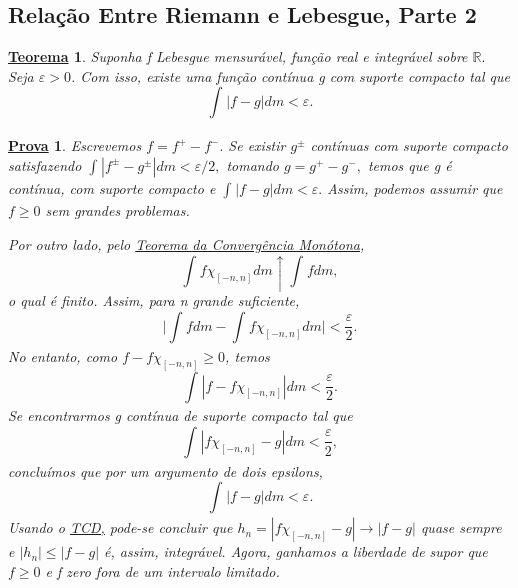 \documentclass{article}
\newtheorem*{theorem*}{\underline{Teorema}}
\newtheorem*{proof*}{\underline{Prova}}
\begin{document}
\subsection{Relação Entre Riemann e Lebesgue, Parte 2}
\begin{theorem*}
  Suponha f Lebesgue mensurável, função real e integrável sobre \(\mathbb{R}.\) Seja \(\varepsilon >0\). 
Com isso, existe uma função contínua g com suporte compacto tal que 
  \[
    \int_{}|f-g| dm < \varepsilon .
  \]
\end{theorem*}
\begin{proof*}
  Escrevemos \(f = f^{+} - f^{-}.\) Se existir \(g^{\pm} \) contínuas com suporte compacto satisfazendo \(\int_{}|f^{\pm} - g^{\pm}| dm < \varepsilon /2,\) 
tomando \(g = g^{+} - g^{-},\) temos que g é contínua, com suporte compacto e \(\int_{}|f-g| dm < \varepsilon .\) Assim, podemos assumir que \(f\geq 0\) sem grandes problemas. 

Por outro lado, pelo \hyperlink{monotone_convergence}{Teorema da Convergência Monótona},
  \[
    \int_{}f \chi_{[-n, n]} dm \uparrow \int_{}f dm,
  \]
o qual é finito. Assim, para n grande suficiente,
  \[
    \biggl\vert \int_{}f dm - \int_{}f \chi_{[-n, n]} dm \biggr\vert < \frac{\varepsilon }{2}.
  \]
No entanto, como \(f - f \chi_{[-n, n]} \geq 0\), temos
  \[
    \int_{}|f - f \chi_{[-n, n]}| dm < \frac{\varepsilon }{2}.
  \]
  Se encontrarmos g contínua de suporte compacto tal que
    \[
      \int_{}|f \chi_{[-n, n]} - g| dm < \frac{\varepsilon }{2},
    \]
  concluímos que por um argumento de dois epsilons,
    \[
      \int_{}|f-g| dm < \varepsilon.
    \]
  Usando o \hyperlink{monotone_convergence}{TCD,} pode-se concluir que \(h_{n} = |f \chi_{[-n, n]} - g|\to |f-g|\) quase sempre e \(|h_{n}| \leq |f-g|\) é, assim, integrável. Agora, ganhamos a liberdade de supor que \(f \geq 0\) e 
  f zero fora de um intervalo limitado.  


\end{proof*}
\end{document}
